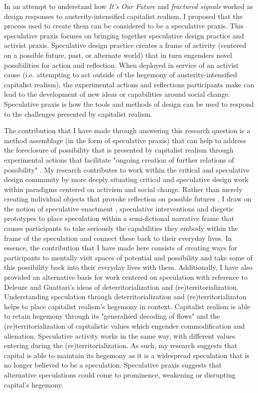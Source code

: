 In an attempt to understand how \textit{It's Our Future} and \textit{fractured signals} worked as design responses to austerity-intensified capitalist realism, I proposed that the process used to create them can be considered to be a speculative praxis. This speculative praxis focuses on bringing together speculative design practice and activist praxis. Speculative design practice creates a frame of activity (centered on a possible future, past, or alternate world) that in turn engenders novel possibilities for action and reflection. When deployed in service of an activist cause (i.e. attempting to act outside of the hegemony of austerity-intensified capitalist realism), the experimental actions and reflections participants make can lead to the development of new ideas or capabilities around social change. Speculative praxis is how the tools and methods of design can be used to respond to the challenges presented by capitalist realism.

The contribution that I have made through answering this research question is a method assemblage (in the form of speculative praxis) that can help to address the foreclosure of possibility that is presented by capitalist realism through experimental actions that facilitate "ongoing creation of further relations of possibility" \citep[p. 320]{harrison_future_2020}. My research contributes to work within the critical and speculative design community by more deeply situating critical and speculative design work within paradigms centered on activism and social change. Rather than merely creating individual objects that provoke reflection on possible futures \citep{auger_speculative_2013, dunne_design_2001, dunne_speculative_2013}, I draw on the notion of speculative enactment \citep{elsden_speculative_2017}, speculative interventions \citep{disalvo_irony_2016} and diegetic prototypes \citep{kirby_future_2010} to place speculation within a semi-fictional narrative frame that causes participants to take seriously the capabilities they embody within the frame of the speculation and connect these back to their everyday lives. In essence, the contribution that I have made here consists of creating ways for participants to mentally visit spaces of potential and possibility and take some of this possibility back into their everyday lives with them. Additionally, I have also provided an alternative basis for work centered on speculation with reference to Deleuze and Guattari's ideas of deterritorialization and (re)territorialization. Understanding speculation through deterritorialization and (re)territorializaton helps to place capitalist realism's hegemony in context. Capitalist realism is able to retain hegemony through its "generalised decoding of flows" \citep[p. 153]{deleuze_anti-oedipus:_1983} and the (re)territorialization of capitalistic values which engender commodification and alienation. Speculative activity works in the same way, with different values entering during the (re)territorialization. As such, my research suggests that capital is able to maintain its hegemony as it is a widespread speculation that is no longer believed to be a speculation. Speculative praxis suggests that alternative speculations could come to prominence, weakening or disrupting capital's hegemony. 

